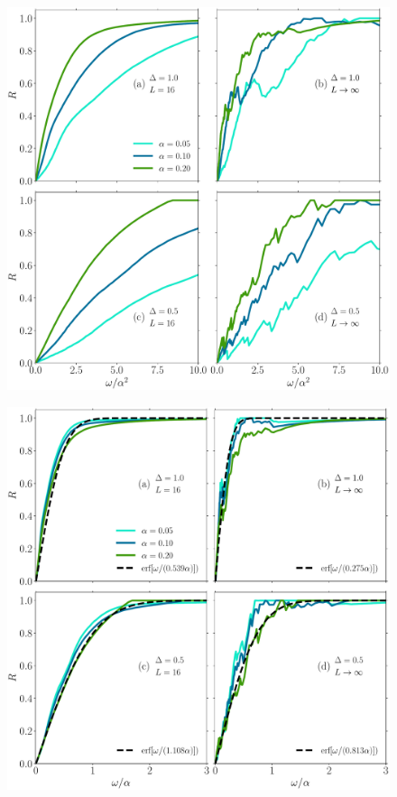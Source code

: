 \begin{figure}[htbp]
  \centering
  \includegraphics[width=1.0\textwidth]{Figures/O12_quadratic_scaling.pdf}
  \caption{}\label{fig:O12 quadratic scaling}
\end{figure}

\begin{figure}[htbp]
  \centering
  \includegraphics[width=1.0\textwidth]{Figures/O12_linear_scaling.pdf}
  \caption{}\label{fig:O12 linear scaling}
\end{figure}

